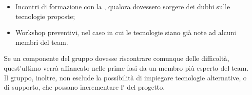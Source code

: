 \begin{itemize}
    \begin{itemize}
        \item Incontri di formazione con la , qualora dovessero sorgere dei dubbi sulle tecnologie proposte;
        \item Workshop preventivi, nel caso in cui le tecnologie siano già note ad alcuni membri del team.
    \end{itemize}
    \par Se un componente del gruppo dovesse riscontrare comunque delle difficoltà, quest'ultimo verrà affiancato nelle prime fasi da un membro più esperto del team. Il gruppo, inoltre, non esclude la possibilità di impiegare tecnologie alternative, o di supporto, che possano incrementare l' del progetto.
\end{itemize}
